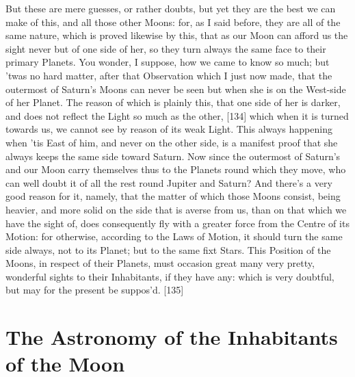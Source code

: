 \documentclass[letterpaper]{book}
\begin{document}
But these are mere guesses, or rather doubts, but yet they are the best we
can make of this, and all those other Moons: for, as I said before, they are
all of the same nature, which is proved likewise by this, that as our Moon
can afford us the sight never but of one side of her, so they turn always
the same face to their primary Planets. You wonder, I suppose, how we came
to know so much; but 'twas no hard matter, after that Observation which I
just now made, that the outermost of Saturn's Moons can never be seen but
when she is on the West-side of her Planet. The reason of which is plainly
this, that one side of her is darker, and does not reflect the Light so much
as the other, [134] which when it is turned towards us, we cannot see by
reason of its weak Light. This always happening when 'tis East of him, and
never on the other side, is a manifest proof that she always keeps the same
side toward Saturn. Now since the outermost of Saturn's and our Moon carry
themselves thus to the Planets round which they move, who can well doubt it
of all the rest round Jupiter and Saturn? And there's a very good reason for
it, namely, that the matter of which those Moons consist, being heavier, and
more solid on the side that is averse from us, than on that which we have
the sight of, does consequently fly with a greater force from the Centre of
its Motion: for otherwise, according to the Laws of Motion, it should turn
the same side always, not to its Planet; but to the same fixt Stars.  This
Position of the Moons, in respect of their Planets, must occasion great many
very pretty, wonderful sights to their Inhabitants, if they have any: which
is very doubtful, but may for the present be suppos'd.  [135]


\section{The Astronomy of the Inhabitants of the Moon}
\end{document}
